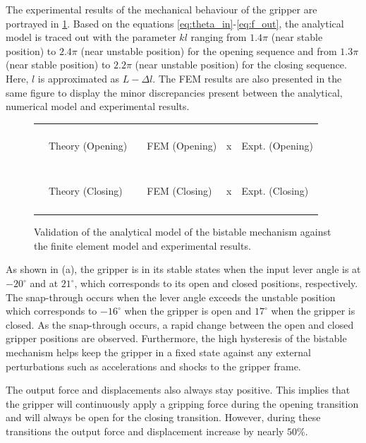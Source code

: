 The experimental results of the mechanical behaviour of the gripper are portrayed in \cref{fig:bistable graph}. Based on the equations \ref{eq:theta_in}-\ref{eq:f_out}, the analytical model is traced out with the parameter $kl$ ranging from $1.4\pi$ (near stable position) to $2.4\pi$ (near unstable position) for the opening sequence and from $1.3\pi$ (near stable position) to $2.2\pi$ (near unstable position) for the closing sequence. Here, $l$ is approximated as $L-\Delta l$. The FEM results are also presented in the same figure to display the minor discrepancies present between the analytical, numerical model and experimental results.
\begin{figure}[htp!] %
    \centering
    \resizebox{0.7\textwidth}{!}{}
    \begin{tabular}{l@{ }l l@{ }l l@{ }l}
        {\color{myblue} \rule[2pt]{10pt}{0.5mm} } & {\footnotesize Theory (Opening)} & {\color{myblue} \rule[2pt]{1pt}{0.5mm} \rule[2pt]{1pt}{0.5mm} \rule[2pt]{1pt}{0.5mm} } & {\footnotesize FEM (Opening)} & {\color{myblue} x } & {\footnotesize Expt. (Opening)}\\
        {\color{myred} \rule[2pt]{10pt}{0.5mm} } & {\footnotesize Theory (Closing)} & {\color{myred} \rule[2pt]{1pt}{0.5mm} \rule[2pt]{1pt}{0.5mm} \rule[2pt]{1pt}{0.5mm} } & {\footnotesize FEM (Closing)} & {\color{myred} x } & {\footnotesize Expt. (Closing)}\\
    \end{tabular}
    \caption{Validation of the analytical model of the bistable mechanism against the finite element model and experimental results.}
    \label{fig:bistable graph}
\end{figure}

As shown in \todocite (a), the gripper is in its stable states when the input lever angle is at $-20^{\circ}$ and at $21^{\circ}$, which corresponds to its open and closed positions, respectively. The snap-through occurs when the lever angle exceeds the unstable position which corresponds to $-16^{\circ}$ when the gripper is open and $17^{\circ}$ when the gripper is closed. As the snap-through occurs, a rapid change between the open and closed gripper positions are observed. Furthermore, the high hysteresis of the bistable mechanism helps keep the gripper in a fixed state against any external perturbations such as accelerations and shocks to the gripper frame.

The output force and displacements also always stay positive. This implies that the gripper will continuously apply a gripping force during the opening transition and will always be open for the closing transition. However, during these transitions the output force and displacement increase by nearly $50$\%.

